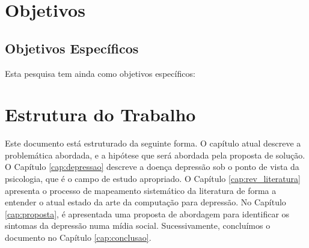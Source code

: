 



\section{Objetivos}
\label{sec:objetivos}

\subsection{Objetivos Específicos}
Esta pesquisa tem ainda como objetivos específicos:

\section{Estrutura do Trabalho}
\label{sec:organizacao}
Este documento está estruturado da seguinte forma. O capítulo atual descreve a problemática abordada, e a hipótese que será abordada pela proposta de solução.
O Capítulo \ref{cap:depressao} descreve a doença depressão sob o ponto de vista da psicologia, que é o campo de estudo apropriado.
O Capítulo \ref{cap:rev_literatura} apresenta o processo de mapeamento sistemático da literatura de forma a entender o atual estado da arte da computação para depressão.
No Capítulo \ref{cap:proposta}, é apresentada uma proposta de abordagem para identificar os sintomas da depressão numa mídia social. Sucessivamente, concluímos o documento no Capítulo \ref{cap:conclusao}.